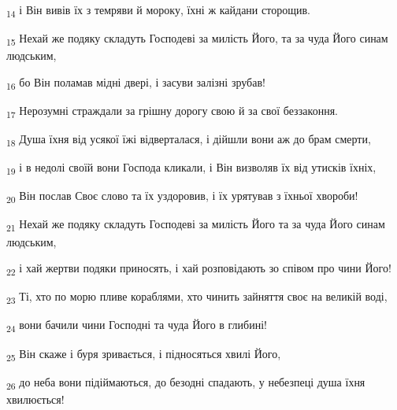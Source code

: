 \begin{tcolorbox}
\textsubscript{14} і Він вивів їх з темряви й мороку, їхні ж кайдани сторощив.
\end{tcolorbox}
\begin{tcolorbox}
\textsubscript{15} Нехай же подяку складуть Господеві за милість Його, та за чуда Його синам людським,
\end{tcolorbox}
\begin{tcolorbox}
\textsubscript{16} бо Він поламав мідні двері, і засуви залізні зрубав!
\end{tcolorbox}
\begin{tcolorbox}
\textsubscript{17} Нерозумні страждали за грішну дорогу свою й за свої беззаконня.
\end{tcolorbox}
\begin{tcolorbox}
\textsubscript{18} Душа їхня від усякої їжі відверталася, і дійшли вони аж до брам смерти,
\end{tcolorbox}
\begin{tcolorbox}
\textsubscript{19} і в недолі своїй вони Господа кликали, і Він визволяв їх від утисків їхніх,
\end{tcolorbox}
\begin{tcolorbox}
\textsubscript{20} Він послав Своє слово та їх уздоровив, і їх урятував з їхньої хвороби!
\end{tcolorbox}
\begin{tcolorbox}
\textsubscript{21} Нехай же подяку складуть Господеві за милість Його та за чуда Його синам людським,
\end{tcolorbox}
\begin{tcolorbox}
\textsubscript{22} і хай жертви подяки приносять, і хай розповідають зо співом про чини Його!
\end{tcolorbox}
\begin{tcolorbox}
\textsubscript{23} Ті, хто по морю пливе кораблями, хто чинить зайняття своє на великій воді,
\end{tcolorbox}
\begin{tcolorbox}
\textsubscript{24} вони бачили чини Господні та чуда Його в глибині!
\end{tcolorbox}
\begin{tcolorbox}
\textsubscript{25} Він скаже і буря зривається, і підносяться хвилі Його,
\end{tcolorbox}
\begin{tcolorbox}
\textsubscript{26} до неба вони підіймаються, до безодні спадають, у небезпеці душа їхня хвилюється!
\end{tcolorbox}
